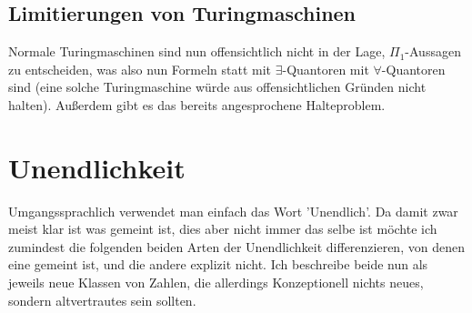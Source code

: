 \documentclass{scrartcl}
\begin{document}

\subsection{Limitierungen von Turingmaschinen}
Normale Turingmaschinen sind nun offensichtlich nicht in der Lage,
$\Pi_1$-Aussagen zu entscheiden, was also nun Formeln statt mit
$\exists$-Quantoren mit $\forall$-Quantoren sind (eine solche Turingmaschine
würde aus offensichtlichen Gründen nicht halten). Außerdem gibt es das bereits
angesprochene Halteproblem.


\section{Unendlichkeit}
Umgangssprachlich verwendet man einfach das Wort 'Unendlich'. Da damit zwar
meist klar ist was gemeint ist, dies aber nicht immer das selbe ist möchte ich
zumindest die folgenden beiden Arten der Unendlichkeit differenzieren, von
denen eine gemeint ist, und die andere explizit nicht. Ich beschreibe beide nun
als jeweils neue Klassen von Zahlen, die allerdings Konzeptionell nichts neues,
sondern altvertrautes sein sollten.
\end{document}
